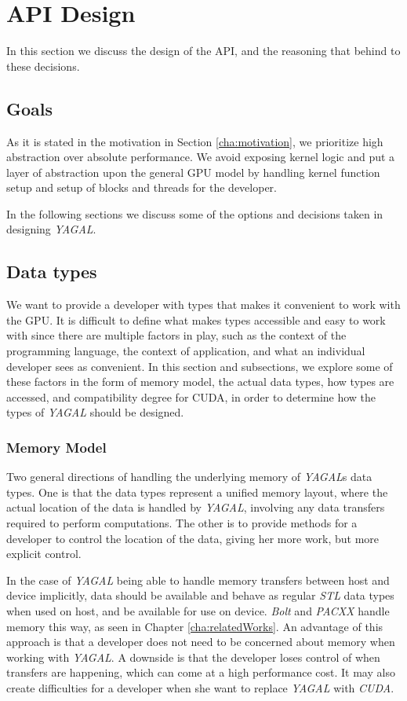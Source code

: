 \section{API Design}
In this section we discuss the design of the API, and the reasoning that behind to these decisions.

\subsection{Goals}
As it is stated in the motivation in Section \ref{cha:motivation}, we prioritize high abstraction over absolute performance. We avoid exposing kernel logic and put a layer of abstraction upon the general GPU model by handling kernel function setup and setup of blocks and threads for the developer.

In the following sections we discuss some of the options and decisions taken in designing \textit{YAGAL}.

\subsection{Data types}
We want to provide a developer with types that makes it convenient to work with the GPU. It is difficult to define what makes types accessible and easy to work with since there are multiple factors in play, such as the context of the programming language, the context of application, and what an individual developer sees as convenient. In this section and subsections, we explore some of these factors in the form of memory model, the actual data types, how types are accessed, and compatibility degree for CUDA, in order to determine how the types of \textit{YAGAL} should be designed.

\subsubsection{Memory Model} \label{memoryModelDesign}
Two general directions of handling the underlying memory of \textit{YAGAL}s data types. One is that the data types represent a unified memory layout, where the actual location of the data is handled by \textit{YAGAL}, involving any data transfers required to perform computations. The other is to provide methods for a developer to control the location of the data, giving her more work, but more explicit control. 

In the case of \textit{YAGAL} being able to handle memory transfers between host and device implicitly, data should be available and behave as regular \textit{STL} data types when used on host, and be available for use on device. \textit{Bolt} and \textit{PACXX} handle memory this way, as seen in Chapter \ref{cha:relatedWorks}. An advantage of this approach is that a developer does not need to be concerned about memory when working with \textit{YAGAL}. A downside is that the developer loses control of when transfers are happening, which can come at a high performance cost. It may also create difficulties for a developer when she want to replace \textit{YAGAL} with \textit{CUDA}.

